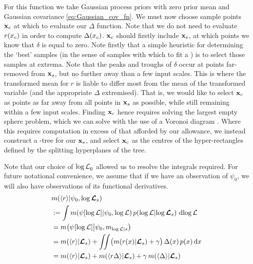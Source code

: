 \documentclass{article}
\begin{document}
For this function we take Gaussian process priors with zero prior mean and Gaussian covariance \eqref{eq:Gaussian_cov_fn}. We must now choose sample points $\vlfv_c$ at which to evaluate our $\Delta$ function. 
Note that we do not need to evaluate $r(\lfv_c)$ in order to compute $\Delta(\lfv_c)$.
$\vlfv_c$ should firstly include $\vlfv_s$, at which points we know that $\delta$ is equal to zero. Note firstly that a simple heuristic for determining the `best' samples (in the sense of samples with which to fit a \gp) is to select those samples at extrema. Note that the peaks and troughs of $\delta$ occur at points far-removed from $\vlfv_s$, but no further away than a few input scales. This is where the transformed mean for $r$ is liable to differ most from the mean of the transformed variable (and the appropriate $\Delta$ extremised). That is, we would like to select $\vlfv_c$ as points as far away from all points in $\vlfv_s$ as possible, while still remaining within a few input scales. 
Finding $\vlfv_c$ hence requires solving the largest empty sphere problem, which we can solve with the use of a Voronoi diagram \citep{Voronoi, shamos1975closest, okabe1997locational}. 
Where this requires computation in excess of that afforded by our allowance, we instead construct a -tree \citep{bentley1975multidimensional} for our $\vlfv_s$, and select $\vlfv_c$ as the centres of the hyper-rectangles defined by the splitting
hyperplanes of the tree.

Note that our choice of $\tr_0$ allowed us to resolve the integrals required. For future notational convenience, we assume that if we have an observation of $\psi_0$, we will also have observations of its functional derivatives.
%
\begin{align}
& \mean{\inty{r}}{\psi_0,\tvr_s} \nonumber\\
& \deq \int \mean{\psi[\tr]}{\psi_0,\tr}
\p{\tr}{\tvr_s}\, \ud \tr 
\nonumber\\
& = \mean{\psi[\tr]}{\psi_0,m_{\tr|s}} \nonumber\\
& = \mean{\inty{r}}{\vr_s} + \iint \bigl(\mean{r(\lfv)}{\vr_s}+\gamma\bigr)\,\Delta(\lfv)\,\po{\lfv}\ud\lfv
\nonumber\\
& = \mean{\inty{r}}{\vr_s} + \mean{\inty{r \Delta}}{\vr_s} + \gamma\, \mean{\inty{ \Delta}}{\vr_s}
\label{eq:mean_ev}
\end{align}
\end{document}
